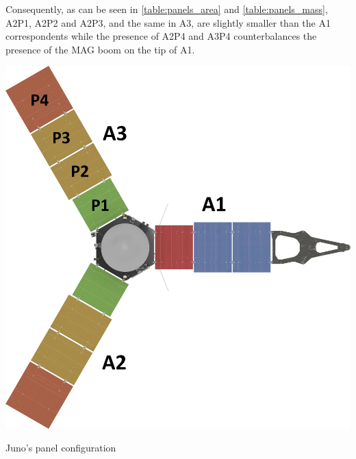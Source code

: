 \vspace{-3mm}

Consequently, as can be seen in \autoref{table:panels_area} and \autoref{table:panels_mass}, A2P1, A2P2 and A2P3, and the same in A3, are slightly smaller than the A1 correspondents while the presence of A2P4 and A3P4 counterbalances the presence of the MAG boom on the tip of A1. 

\vspace{3mm}

\begin{minipage}{0.4\linewidth}
    \centering
    \captionsetup{type=figure}
    \includegraphics[width=\linewidth]{Images/Juno panels.jpg}
    \caption{Juno's panel configuration}
    \label{fig:panel_config}
\end{minipage}\hfill
